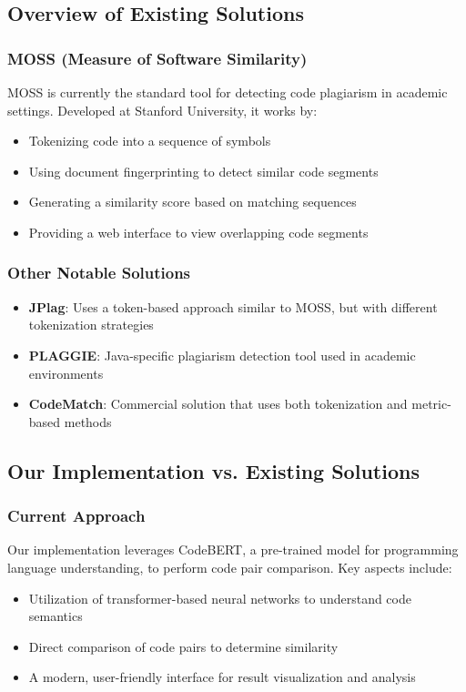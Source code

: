 \documentclass[12pt, titlepage]{article}
\begin{document}
\subsection{Overview of Existing Solutions}

\subsubsection{MOSS (Measure of Software Similarity)}
MOSS is currently the standard tool for detecting code plagiarism in academic settings. Developed at Stanford University, it works by:
\begin{itemize}
    \item Tokenizing code into a sequence of symbols
    \item Using document fingerprinting to detect similar code segments
    \item Generating a similarity score based on matching sequences
    \item Providing a web interface to view overlapping code segments
\end{itemize}

\subsubsection{Other Notable Solutions}
\begin{itemize}
    \item \textbf{JPlag}: Uses a token-based approach similar to MOSS, but with different tokenization strategies
    \item \textbf{PLAGGIE}: Java-specific plagiarism detection tool used in academic environments
    \item \textbf{CodeMatch}: Commercial solution that uses both tokenization and metric-based methods
\end{itemize}

\subsection{Our Implementation vs. Existing Solutions}

\subsubsection{Current Approach}
Our implementation leverages CodeBERT, a pre-trained model for programming language understanding, to perform code pair comparison. Key aspects include:
\begin{itemize}
    \item Utilization of transformer-based neural networks to understand code semantics
    \item Direct comparison of code pairs to determine similarity
    \item A modern, user-friendly interface for result visualization and analysis
\end{itemize}
\end{document}
